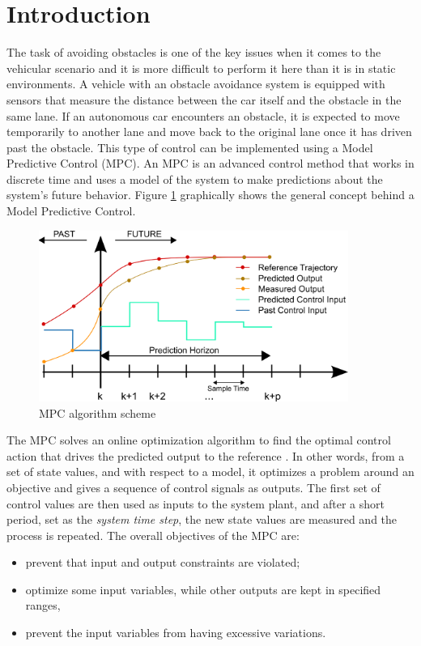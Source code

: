 \section{Introduction}
\label{sec:intro}
The task of avoiding obstacles is one of the key issues when it comes to the vehicular scenario and it is more difficult to perform it here than it is in static environments.
A vehicle with an obstacle avoidance system is equipped with sensors that measure the distance between the car itself and the obstacle in the same lane. If an autonomous car encounters an obstacle, it is expected to move temporarily to another lane and move back to the original lane once it has driven past the obstacle. This type of control can be implemented using a Model Predictive Control (MPC).
An MPC is an advanced control method that works in discrete time and uses a model of the system to make predictions about the system’s future behavior. 
Figure \ref{fig:MPC_scheme} graphically shows the general concept behind a Model Predictive Control.
\begin{figure}[H]
    \centering
    \includegraphics[width=0.9\textwidth]{Figures/MPC_scheme_basic.png}
    \caption{MPC algorithm scheme}
    \label{fig:MPC_scheme}
\end{figure}
The MPC solves an online optimization algorithm to find the optimal control action that drives the predicted output to the reference \cite{MPC_Def}. In other words, from a set of state values, and with respect to a model, it optimizes a problem around an objective and gives a sequence of control signals as outputs. The first set of control values are then used as inputs to the system plant, and after a short period, set as the \emph{system time step}, the new state values are measured and the process is repeated.
The overall objectives of the MPC are:
\begin{itemize}
 

\item prevent that input and output constraints are violated;
\item optimize some input variables, while other outputs are kept in specified ranges,
\item prevent the input variables from having excessive variations.
\end{itemize}
